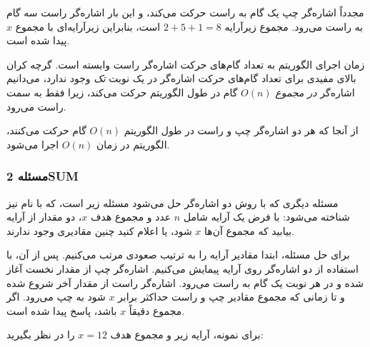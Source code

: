مجدداً اشاره‌گر چپ یک گام به راست حرکت می‌کند،
و این بار اشاره‌گر راست سه گام
به راست می‌رود.
مجموع زیرآرایه $2+5+1=8$ است، بنابراین زیرآرایه‌ای
با مجموع $x$ پیدا شده است.

\begin{center}
\end{center}

زمان اجرای الگوریتم به تعداد گام‌های
حرکت اشاره‌گر راست وابسته است.
گرچه کران بالای مفیدی برای تعداد گام‌های حرکت اشاره‌گر
در یک نوبت \emph{تک} وجود ندارد،
می‌دانیم اشاره‌گر \emph{در مجموع}
$O(n)$ گام در طول الگوریتم حرکت می‌کند،
زیرا فقط به سمت راست می‌رود.

از آنجا که هر دو اشاره‌گر چپ و راست
در طول الگوریتم $O(n)$ گام حرکت می‌کنند،
الگوریتم در زمان $O(n)$ اجرا می‌شود.

\subsubsection{مسئله 2SUM}


مسئله دیگری که با روش دو اشاره‌گر
حل می‌شود مسئله زیر است،
که با نام  نیز شناخته می‌شود:
با فرض یک آرایه شامل $n$ عدد و
مجموع هدف $x$، دو مقدار
از آرایه بیابید که مجموع آن‌ها $x$ شود،
یا اعلام کنید چنین مقادیری وجود ندارند.

برای حل مسئله، ابتدا
مقادیر آرایه را به ترتیب صعودی مرتب می‌کنیم.
پس از آن، با استفاده از دو اشاره‌گر
روی آرایه پیمایش می‌کنیم.
اشاره‌گر چپ از مقدار نخست آغاز شده
و در هر نوبت یک گام به راست می‌رود.
اشاره‌گر راست از مقدار آخر شروع شده
و تا زمانی که مجموع مقادیر
چپ و راست حداکثر برابر $x$ شود به چپ می‌رود.
اگر مجموع دقیقاً $x$ باشد،
پاسخ پیدا شده است.

برای نمونه، آرایه زیر
و مجموع هدف $x=12$ را در نظر بگیرید:
\begin{center}
\end{center}

